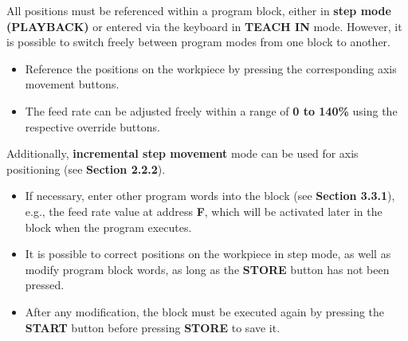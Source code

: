 All positions must be referenced within a program block, either in \textbf{step mode (PLAYBACK)} or entered via the keyboard in \textbf{TEACH IN} mode. However, it is possible to switch freely between program modes from one block to another.

\procedure

\begin{itemize}
    \vspace{.5cm}
    \item Reference the positions on the workpiece by pressing the corresponding axis movement buttons.
    \item The feed rate can be adjusted freely within a range of \textbf{0 to 140\%} using the respective override buttons.
\end{itemize}

Additionally, \textbf{incremental step movement} mode can be used for axis positioning (see \textbf{Section 2.2.2}).

\begin{itemize}
    \item If necessary, enter other program words into the block (see \textbf{Section 3.3.1}), e.g., the feed rate value at address \textbf{F}, which will be activated later in the block when the program executes.
\end{itemize}

\begin{itemize}
\end{itemize}

\vspace{.5cm}

\begin{itemize}
\end{itemize}
\vspace{.5cm}
\notes

\begin{itemize}
    \item It is possible to correct positions on the workpiece in step mode, as well as modify program block words, as long as the \textbf{STORE} button has not been pressed.
    \item After any modification, the block must be executed again by pressing the \textbf{START} button before pressing \textbf{STORE} to save it.
\end{itemize}

